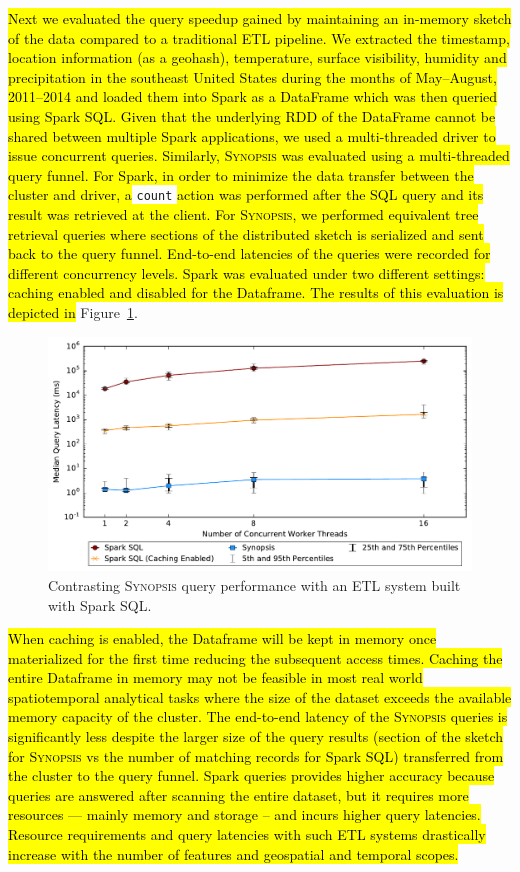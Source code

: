 \hl{Next we evaluated the query speedup gained by maintaining an in-memory sketch of the data compared to a traditional ETL pipeline.
We extracted the timestamp, location information (as a geohash), temperature, surface visibility, humidity and precipitation in the southeast United States during the months of May--August, 2011--2014 and loaded them into Spark as a DataFrame which was then queried using Spark SQL.
Given that the underlying RDD of the DataFrame cannot be shared between multiple Spark applications, we used a multi-threaded driver to issue concurrent queries.
Similarly, \textsc{Synopsis} was evaluated using a multi-threaded query funnel.
For Spark, in order to minimize the data transfer between the cluster and driver, a} \texttt{count} \hl{action was performed after the SQL query and its result was retrieved at the client.
For \textsc{Synopsis}, we performed equivalent tree retrieval queries where sections of the distributed sketch is serialized and sent back to the query funnel.
End-to-end latencies of the queries were recorded for different concurrency levels.
Spark was evaluated under two different settings: caching enabled and disabled for the Dataframe.
The results of this evaluation is depicted in} Figure~\ref{fig:spark-sql-query}.
%
\begin{figure}[b!]
    \centerline{\includegraphics[width=\linewidth]{figures/spark-sql-query-complete.pdf}}
    \caption{Contrasting \textsc{Synopsis} query performance with an ETL system built with Spark SQL.}
    \label{fig:spark-sql-query}
\end{figure}
%
\hl{When caching is enabled, the Dataframe will be kept in memory once materialized for the first time reducing the subsequent access times. Caching the entire Dataframe in memory may not be feasible in most real world spatiotemporal analytical tasks where the size of the dataset exceeds the available memory capacity of the cluster.
The end-to-end latency of the \textsc{Synopsis} queries is significantly less despite the larger size of the query results (section of the sketch for \textsc{Synopsis} vs the number of matching records for Spark SQL) transferred from the cluster to the query funnel.
Spark queries provides higher accuracy because queries are answered after scanning the entire dataset, but it requires more resources --- mainly memory and storage -- and incurs higher query latencies.
Resource requirements and query latencies with such ETL systems drastically increase with the number of features and geospatial and temporal scopes.}